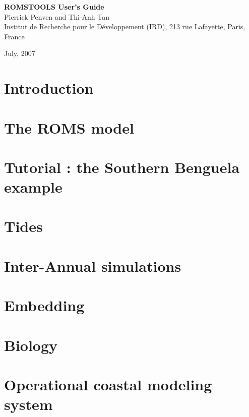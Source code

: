 \documentclass[10pt]{article}
\begin{document}
\setcounter{page}{0}
\pagestyle{empty}
\begin{center}
\vspace{3 cm}
{\huge \bf ROMSTOOLS User's Guide }\\
\vspace{2 cm}
{\Large Pierrick Penven and Thi-Anh Tan}\\ 
\vspace{1 cm}
{\large Institut de Recherche pour le D\'eveloppement (IRD),
213 rue Lafayette, Paris,
France} \\
\vspace{2cm}
\centerline{}
\vspace{1cm}

{July, 2007}


\end{center}

\pagebreak
\setcounter{page}{0}
\tableofcontents
\pagebreak
\pagestyle{plain}

\section{Introduction}


\section{The ROMS model}


\section{Tutorial : the Southern Benguela example}


\section{Tides}


\section{Inter-Annual simulations}


\section{Embedding}


\section{Biology}


\section{Operational coastal modeling system}


\pagebreak
\begin{thebibliography}{}

\end{thebibliography}
\end{document}
